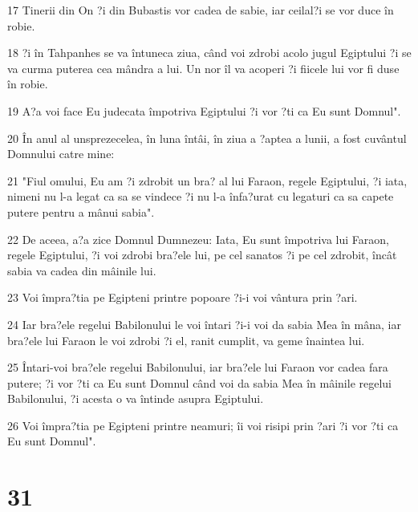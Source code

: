 \par 17 Tinerii din On ?i din Bubastis vor cadea de sabie, iar ceilal?i se vor duce în robie.
\par 18 ?i în Tahpanhes se va întuneca ziua, când voi zdrobi acolo jugul Egiptului ?i se va curma puterea cea mândra a lui. Un nor îl va acoperi ?i fiicele lui vor fi duse în robie.
\par 19 A?a voi face Eu judecata împotriva Egiptului ?i vor ?ti ca Eu sunt Domnul".
\par 20 În anul al unsprezecelea, în luna întâi, în ziua a ?aptea a lunii, a fost cuvântul Domnului catre mine:
\par 21 "Fiul omului, Eu am ?i zdrobit un bra? al lui Faraon, regele Egiptului, ?i iata, nimeni nu l-a legat ca sa se vindece ?i nu l-a înfa?urat cu legaturi ca sa capete putere pentru a mânui sabia".
\par 22 De aceea, a?a zice Domnul Dumnezeu: Iata, Eu sunt împotriva lui Faraon, regele Egiptului, ?i voi zdrobi bra?ele lui, pe cel sanatos ?i pe cel zdrobit, încât sabia va cadea din mâinile lui.
\par 23 Voi împra?tia pe Egipteni printre popoare ?i-i voi vântura prin ?ari.
\par 24 Iar bra?ele regelui Babilonului le voi întari ?i-i voi da sabia Mea în mâna, iar bra?ele lui Faraon le voi zdrobi ?i el, ranit cumplit, va geme înaintea lui.
\par 25 Întari-voi bra?ele regelui Babilonului, iar bra?ele lui Faraon vor cadea fara putere; ?i vor ?ti ca Eu sunt Domnul când voi da sabia Mea în mâinile regelui Babilonului, ?i acesta o va întinde asupra Egiptului.
\par 26 Voi împra?tia pe Egipteni printre neamuri; îi voi risipi prin ?ari ?i vor ?ti ca Eu sunt Domnul".

\chapter{31}

